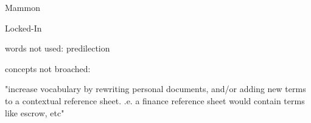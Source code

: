 Mammon

Locked-In

words not used:
predilection


concepts not broached:

"increase vocabulary by rewriting personal documents, and/or adding new terms to a contextual reference sheet.
.e. a finance reference sheet would contain terms like escrow, etc"

